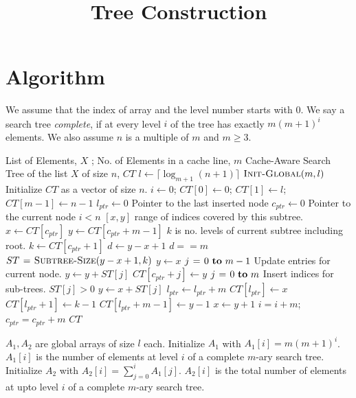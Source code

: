\documentclass[integrals, nointegrals, article, 12pt, a4paper]{article}
\date{}
\title{Tree Construction}
\begin{document}
\maketitle

\section{Algorithm}
\label{sec-1}
We assume that the index of array and the level number starts with
$0$.  We say a search tree \emph{complete}, if at every level $i$ of the
tree has exactly $m(m+1)^{i}$ elements. We also assume $n$ is a
multiple of $m$ and $m \geq 3$.

\begin{codebox}
\zi {} List of Elements, $X$ ; No. of Elements in a cache line, $m$
\zi {} Cache-Aware Search Tree of the list $X$ of size $n$, $CT$
\li $l \gets \lceil \log_{m+1} (n+1) \rceil$
\li $\textnormal{\scshape Init-Global}(m, l)$
\li Initialize $CT$ as a vector of size $n$.
\li $i \gets 0$; $CT[0] \gets 0$; $CT[1] \gets l$; $CT[m - 1] \gets n - 1$
\li $l_{ptr} \gets 0$ \Comment Pointer to the last inserted node
\li $c_{ptr} \gets 0$ \Comment Pointer to the current node
\li \While $i < n$
    \Do
\zi      \Comment $[x,y]$ range of indices covered by this subtree.
\li      $x \gets CT[c_{ptr}]$
\li      $y \gets CT[c_{ptr} + m - 1]$
\zi      \Comment $k$ is no. levels of current subtree including root.
\li      $k \gets CT[c_{ptr} + 1]$
\li      $d \gets y - x + 1$
\li      \If $d == m$
         \Then
\li
\li      $ST \mathrel{\hspace{1pt}=\hspace{1pt}} \textnormal{\scshape Subtree-Size}(y - x + 1, k)$
\li      $y \gets x$
\li      \For $j \gets 0 \To m - 1$ \Comment Update entries for current node.
         \Do
\li           $y \gets y + ST[j]$
\li           $CT[c_{ptr} + j] \gets y$
         \End
\li      \For $j \gets 0 \To m$ \Comment Insert indices for sub-trees.
         \Do
\li           \If $ST[j] > 0$
              \Do
\li               $y \gets x + ST[j]$
\li               $l_{ptr} \gets l_{ptr} + m$
\li               $CT[l_{ptr}] \gets x$
\li               $CT[l_{ptr} + 1] \gets k - 1$
\li               $CT[l_{ptr} + m - 1] \gets y - 1$
\li               $x \gets y + 1$
              \End
        \End
\li     $i = i + m$; $c_{ptr} = c_{ptr} + m$
    \End
\li \Return $CT$
\end{codebox}

\begin{codebox}
\zi $A_1, A_2$ are global arrays of size $l$ each.
\li Initialize $A_1$ with $A_1[i] = m(m+1)^{i}$.
\zi \quad $A_1[i]$ is the number of elements at level $i$ of a
    complete $m$-ary search tree.
\li Initialize $A_2$ with $A_2[i] = \sum_{j = 0}^i A_1[j]$.
\zi \quad $A_2[i]$ is the total number of elements at upto
    level $i$ of a complete $m$-ary search tree.
\end{codebox}
\end{document}
